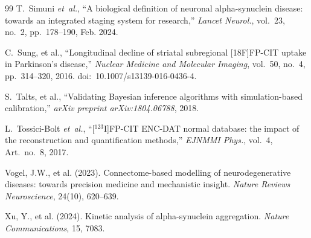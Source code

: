 \begin{thebibliography}{99}
T.~Simuni \textit{et~al.}, ``A biological definition of neuronal alpha-synuclein disease: towards an integrated staging system for research,'' \textit{Lancet Neurol.}, vol.~23, no.~2, pp.~178--190, Feb. 2024.

C.~Sung, et al., ``Longitudinal decline of striatal subregional [18F]FP-CIT uptake in Parkinson's disease,'' \textit{Nuclear Medicine and Molecular Imaging}, vol.~50, no.~4, pp.~314--320, 2016. doi:~10.1007/s13139-016-0436-4.

S.~Talts, et al., ``Validating Bayesian inference algorithms with simulation-based calibration,'' \textit{arXiv preprint arXiv:1804.06788}, 2018.


L.~Tossici-Bolt \textit{et~al.}, ``[$^{123}$I]FP-CIT ENC-DAT normal database: the impact of the reconstruction and quantification methods,'' \textit{EJNMMI Phys.}, vol.~4, Art.\ no.~8, 2017.

Vogel, J.W., et al. (2023).
\newblock Connectome-based modelling of neurodegenerative diseases: towards precision medicine and mechanistic insight.
\newblock \emph{Nature Reviews Neuroscience}, 24(10), 620--639.

Xu, Y., et al. (2024).
\newblock Kinetic analysis of alpha-synuclein aggregation.
\newblock \emph{Nature Communications}, 15, 7083.

\end{thebibliography}
